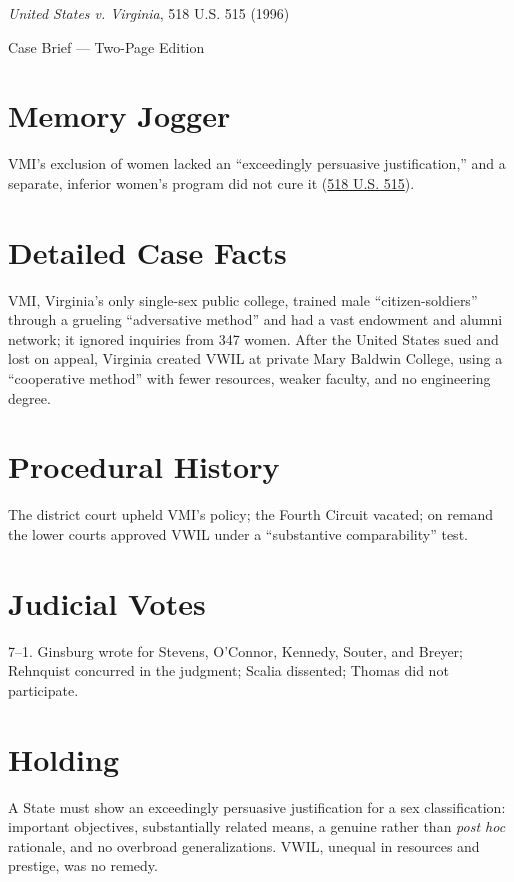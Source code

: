 \documentclass[12pt]{article}
\begin{document}
\begin{center}
{\LARGE \textit{United States v. Virginia}, 518 U.S. 515 (1996)\par}
\vspace{0.5em}
{\large Case Brief --- Two-Page Edition\par}
\end{center}

\section{Memory Jogger}
VMI's exclusion of women lacked an ``exceedingly persuasive justification,'' and a separate, inferior women's program did not cure it (\href{https://supreme.justia.com/cases/federal/us/518/515/}{518 U.S. 515}).

\section{Detailed Case Facts}
VMI, Virginia's only single-sex public college, trained male ``citizen-soldiers'' through a grueling ``adversative method'' and had a vast endowment and alumni network; it ignored inquiries from 347 women. After the United States sued and lost on appeal, Virginia created VWIL at private Mary Baldwin College, using a ``cooperative method'' with fewer resources, weaker faculty, and no engineering degree.

\section{Procedural History}
The district court upheld VMI's policy; the Fourth Circuit vacated; on remand the lower courts approved VWIL under a ``substantive comparability'' test.

\section{Judicial Votes}
7--1. Ginsburg wrote for Stevens, O'Connor, Kennedy, Souter, and Breyer; Rehnquist concurred in the judgment; Scalia dissented; Thomas did not participate.

\section{Holding}
A State must show an exceedingly persuasive justification for a sex classification: important objectives, substantially related means, a genuine rather than \textit{post hoc} rationale, and no overbroad generalizations. VWIL, unequal in resources and prestige, was no remedy.
\end{document}
